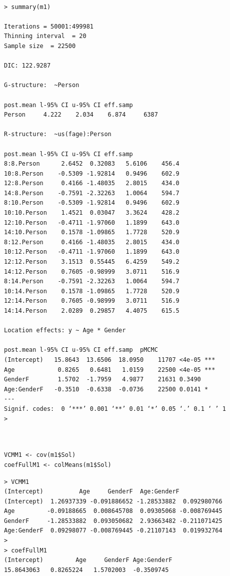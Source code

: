 \documentclass[a4paper,12pt]{article}
\begin{document}
\begin{verbatim}

> summary(m1)

Iterations = 50001:499981
Thinning interval  = 20
Sample size  = 22500 

DIC: 122.9287 

G-structure:  ~Person

post.mean l-95% CI u-95% CI eff.samp
Person     4.222    2.034    6.874     6387

R-structure:  ~us(fage):Person

post.mean l-95% CI u-95% CI eff.samp
8:8.Person      2.6452  0.32083   5.6106    456.4
10:8.Person    -0.5309 -1.92814   0.9496    602.9
12:8.Person     0.4166 -1.48035   2.8015    434.0
14:8.Person    -0.7591 -2.32263   1.0064    594.7
8:10.Person    -0.5309 -1.92814   0.9496    602.9
10:10.Person    1.4521  0.03047   3.3624    428.2
12:10.Person   -0.4711 -1.97060   1.1899    643.0
14:10.Person    0.1578 -1.09865   1.7728    520.9
8:12.Person     0.4166 -1.48035   2.8015    434.0
10:12.Person   -0.4711 -1.97060   1.1899    643.0
12:12.Person    3.1513  0.55445   6.4259    549.2
14:12.Person    0.7605 -0.98999   3.0711    516.9
8:14.Person    -0.7591 -2.32263   1.0064    594.7
10:14.Person    0.1578 -1.09865   1.7728    520.9
12:14.Person    0.7605 -0.98999   3.0711    516.9
14:14.Person    2.0289  0.29857   4.4075    615.5

Location effects: y ~ Age * Gender 

post.mean l-95% CI u-95% CI eff.samp  pMCMC    
(Intercept)   15.8643  13.6506  18.0950    11707 <4e-05 ***
Age            0.8265   0.6481   1.0159    22500 <4e-05 ***
GenderF        1.5702  -1.7959   4.9877    21631 0.3490    
Age:GenderF   -0.3510  -0.6338  -0.0736    22500 0.0141 *  
---
Signif. codes:  0 ‘***’ 0.001 ‘**’ 0.01 ‘*’ 0.05 ‘.’ 0.1 ‘ ’ 1
> 

\end{verbatim}

\begin{framed}
	\begin{verbatim}


VCMM1 <- cov(m1$Sol)
coefFullM1 <- colMeans(m1$Sol)
\end{verbatim}
\end{framed}

\begin{verbatim}
> VCMM1 
(Intercept)          Age     GenderF  Age:GenderF
(Intercept)  1.26937339 -0.091886652 -1.28533882  0.092980766
Age         -0.09188665  0.008645708  0.09305068 -0.008769445
GenderF     -1.28533882  0.093050682  2.93663482 -0.211071425
Age:GenderF  0.09298077 -0.008769445 -0.21107143  0.019932764
> 
> coefFullM1
(Intercept)         Age     GenderF Age:GenderF 
15.8643063   0.8265224   1.5702003  -0.3509745 

\end{verbatim}
\end{document}
